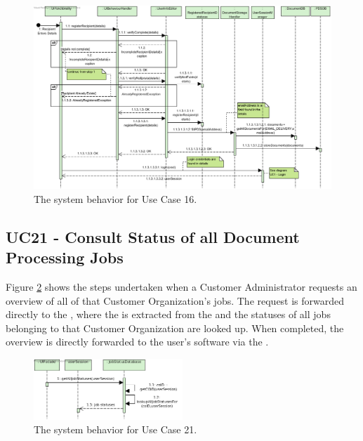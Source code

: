 \begin{figure}[!htp]
    \centering
    \includegraphics[width=\textwidth]{figures/UC16 - Register to PDS.png}
    \caption{The system behavior for Use Case 16.
        }\label{fig:seq_uc16}
\end{figure}

\subsection{UC21 - Consult Status of all Document Processing Jobs}
Figure \ref{fig:seq_uc21} shows the steps undertaken when a Customer Administrator requests an overview of all of that Customer Organization's jobs. The request is forwarded directly to the , where the  is extracted from the  and the statuses of all jobs belonging to that Customer Organization are looked up. When completed, the overview is directly forwarded to the user's software via the .

\begin{figure}[!htp]
    \centering
    \includegraphics[width=0.5\textwidth]{figures/UC21 - Consult Status of all Document Processing Jobs.png}
    \caption{The system behavior for Use Case 21.
        }\label{fig:seq_uc21}
\end{figure}

